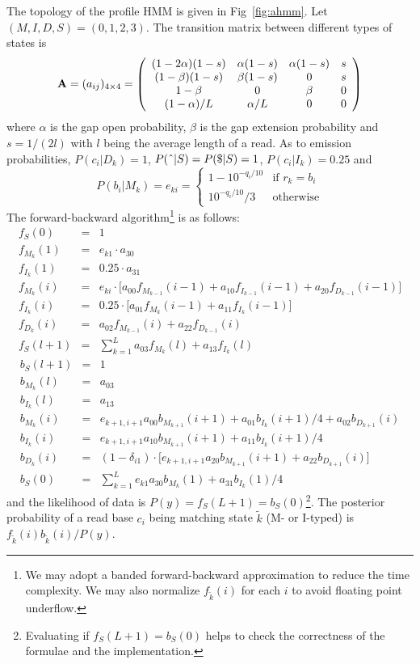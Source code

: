 \documentclass[pdftex,10pt]{book}
\begin{document}
The topology of the profile HMM is given in Fig~\ref{fig:ahmm}. Let
$(M,I,D,S)=(0,1,2,3)$. The transition matrix between different types of
states is
$$
{\bf A}=(a_{ij})_{4\times4}=\left(\begin{array}{cccc}
(1-2\alpha)(1-s) & \alpha(1-s) & \alpha(1-s) & s\\
(1-\beta)(1-s) & \beta(1-s) & 0 & s \\
1-\beta & 0 & \beta & 0 \\
(1-\alpha)/L & \alpha/L & 0 & 0 \\
\end{array}\right)
$$
where $\alpha$ is the gap open probability, $\beta$ is the gap extension
probability and $s=1/(2l)$ with $l$ being the average length of a
read. As to emission probabilities, $P(c_i|D_k)=1$,
$P({\tt\char94}|S)=P({\tt\char36}|S)=1$, $P(c_i|I_k)=0.25$ and
$$
P(b_i|M_k)=e_{ki}=\left\{\begin{array}{ll}
1-10^{-q_i/10} & \mbox{if $r_k=b_i$} \\
10^{-q_i/10}/3 & \mbox{otherwise}
\end{array}\right.
$$
The forward-backward algorithm\footnote{We may adopt a banded
  forward-backward approximation to reduce the time complexity. We may
  also normalize $f_{\tilde{k}}(i)$ for each $i$ to avoid floating point
  underflow.} is as follows:
\begin{eqnarray*}
f_S(0)&=&1\\
f_{M_k}(1)&=&e_{k1}\cdot a_{30}\\
f_{I_k}(1)&=&0.25\cdot a_{31}\\
f_{M_k}(i)&=&e_{ki}\cdot\Big[a_{00}f_{M_{k-1}}(i-1)+a_{10}f_{I_{k-1}}(i-1)+a_{20}f_{D_{k-1}}(i-1)\Big]\\
f_{I_k}(i)&=&0.25\cdot\Big[a_{01}f_{M_k}(i-1)+a_{11}f_{I_k}(i-1)\Big]\\
f_{D_k}(i)&=&a_{02}f_{M_{k-1}}(i)+a_{22}f_{D_{k-1}}(i)\\
f_S(l+1)&=&\sum_{k=1}^La_{03}f_{M_k}(l)+a_{13}f_{I_k}(l)
\end{eqnarray*}
\begin{eqnarray*}
b_S(l+1)&=&1\\
b_{M_k}(l)&=&a_{03}\\
b_{I_k}(l)&=&a_{13}\\
b_{M_k}(i)&=&e_{k+1,i+1}a_{00}b_{M_{k+1}}(i+1)+a_{01}b_{I_k}(i+1)/4+a_{02}b_{D_{k+1}}(i)\\
b_{I_k}(i)&=&e_{k+1,i+1}a_{10}b_{M_{k+1}}(i+1)+a_{11}b_{I_k}(i+1)/4\\
b_{D_k}(i)&=&(1-\delta_{i1})\cdot\Big[e_{k+1,i+1}a_{20}b_{M_{k+1}}(i+1)+a_{22}b_{D_{k+1}}(i)\Big]\\
b_S(0)&=&\sum_{k=1}^Le_{k1}a_{30}b_{M_k}(1)+a_{31}b_{I_k}(1)/4
\end{eqnarray*}
and the likelihood of data is $P(y)=f_S(L+1)=b_S(0)$\footnote{Evaluating
  if $f_S(L+1)=b_S(0)$ helps to check the correctness of the formulae
  and the implementation.}. The posterior probability of a read base
$c_i$ being matching state $\tilde{k}$ (M- or I-typed) is
$f_{\tilde{k}}(i)b_{\tilde{k}}(i)/P(y)$.
\end{document}
